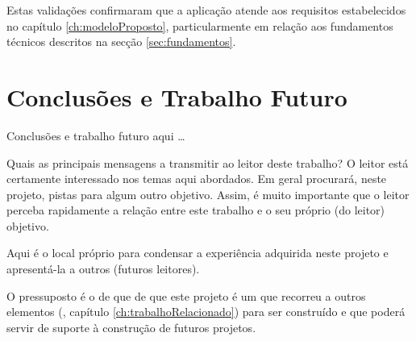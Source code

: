 Estas validações confirmaram que a aplicação atende aos requisitos estabelecidos no capítulo \ref{ch:modeloProposto}, particularmente em relação aos fundamentos técnicos descritos na secção \ref{sec:fundamentos}.

\chapter{Conclusões e Trabalho Futuro}
\label{ch:conclusoesTrabalhoFuturo}

Conclusões e trabalho futuro aqui \ldots

Quais as principais mensagens a transmitir ao leitor deste trabalho? O leitor está certamente interessado nos temas aqui abordados. Em geral procurará, neste projeto, pistas para algum outro objetivo. Assim, é muito importante que o leitor perceba rapidamente a relação entre este trabalho e o seu próprio (do leitor) objetivo.

Aqui é o local próprio para condensar a experiência adquirida neste projeto e apresentá-la a outros (futuros leitores).

O pressuposto é o de que de que este projeto é um  que recorreu a outros elementos (\cf, capítulo \ref{ch:trabalhoRelacionado}) para ser construído e que poderá servir de suporte à construção de futuros projetos.








